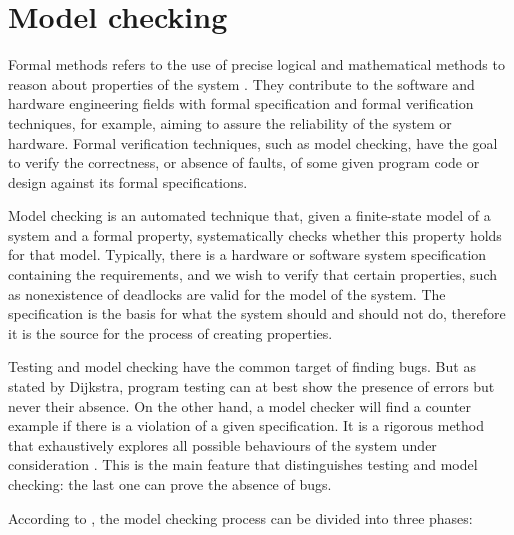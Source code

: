 \section{Model checking}
\label{sec-modelcheck}

Formal methods refers to the use of precise logical and mathematical methods to reason about properties of the system \cite{Eriksson}. They contribute to the software and hardware engineering fields with formal specification and formal verification techniques, for example, aiming to assure the reliability of the system or hardware. Formal verification techniques, such as model checking, have the goal to verify the correctness, or absence of faults, of some given program code or design against its formal specifications\cite{Tian}.

Model checking is an automated technique that, given a finite-state model of a system and a formal property, systematically checks whether this property holds for that model\cite{Baier}. Typically, there is a hardware or software system specification containing the requirements, and we wish to verify that certain properties, such as nonexistence of deadlocks are valid for the model of the system. The specification is the basis for what the system should and should not do, therefore it is the source for the process of creating properties.

Testing and model checking have the common target of finding bugs. But as stated by Dijkstra\cite{dijkstra}, program testing can at best show the presence of errors but never their absence. On the other hand, a model checker will find a counter example if there is a violation of a given specification. It is a rigorous method that exhaustively explores all possible behaviours of the system under consideration \cite{testVsModelCheck}. This is the main feature that distinguishes testing and model checking: the last one can prove the absence of bugs\cite{patrice}.

According to \cite{Baier}, the model checking process can be divided into three phases:

